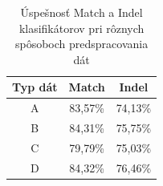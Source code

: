 \todo

\begin{table}[htp]
\centering
\begin{tabular}{c|cc}
Typ dát & Match & Indel\\
\hline
A & 83,57\% & 74,13\%\\
B & 84,31\% & 75,75\%\\
C & 79,79\% & 75,03\%\\
D & 84,32\% & 76,46\%\\
\end{tabular}
\caption[Úspešnosť klasifikátorov pri rôznych typoch dát]{Úspešnosť Match a Indel klasifikátorov pri rôznych spôsoboch predspracovania dát}
\label{tab:datatype-all}
\end{table}






